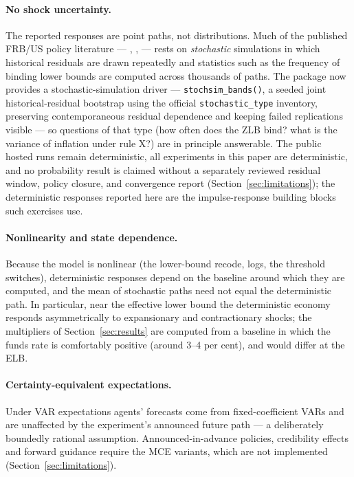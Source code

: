 \paragraph{No shock uncertainty.} The reported responses are point paths, not distributions. Much of the published FRB/US policy literature --- \citet{reifschneider2000three}, \citet{reifschneider2016gauging}, \citet{bernanke2019strategies} --- rests on \emph{stochastic} simulations in which historical residuals are drawn repeatedly and statistics such as the frequency of binding lower bounds are computed across thousands of paths. The package now provides a stochastic-simulation driver --- \texttt{stochsim\_bands()}, a seeded joint historical-residual bootstrap using the official \texttt{stochastic\_type} inventory, preserving contemporaneous residual dependence and keeping failed replications visible --- so questions of that type (how often does the ZLB bind? what is the variance of inflation under rule X?) are in principle answerable. The public hosted runs remain deterministic, all experiments in this paper are deterministic, and no probability result is claimed without a separately reviewed residual window, policy closure, and convergence report (Section~\ref{sec:limitations}); the deterministic responses reported here are the impulse-response building blocks such exercises use.

\paragraph{Nonlinearity and state dependence.} Because the model is nonlinear (the lower-bound recode, logs, the threshold switches), deterministic responses depend on the baseline around which they are computed, and the mean of stochastic paths need not equal the deterministic path. In particular, near the effective lower bound the deterministic economy responds asymmetrically to expansionary and contractionary shocks; the multipliers of Section~\ref{sec:results} are computed from a baseline in which the funds rate is comfortably positive (around 3--4 per cent), and would differ at the ELB.

\paragraph{Certainty-equivalent expectations.} Under VAR expectations agents' forecasts come from fixed-coefficient VARs and are unaffected by the experiment's announced future path --- a deliberately boundedly rational assumption. Announced-in-advance policies, credibility effects and forward guidance require the MCE variants, which are not implemented (Section~\ref{sec:limitations}).

